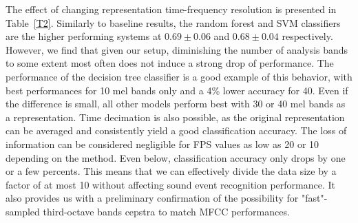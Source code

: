 \documentclass[final,3p,times,twocolumn]{elsarticle}
\begin{document}
The effect of changing representation time-frequency resolution is presented in Table~\ref{T2}. Similarly to baseline results, the random forest and SVM classifiers are the higher performing systems at $0.69\pm 0.06$ and $0.68\pm 0.04$ respectively. However, we find that given our setup, diminishing the number of analysis bands to some extent most often does not induce a strong drop of performance. The performance of the decision tree classifier is a good example of this behavior, with best performances for 10 mel bands only and a 4\% lower accuracy for 40. Even if the difference is small, all other models perform best with 30 or 40 mel bands as a representation. Time decimation is also possible, as the original representation can be averaged and consistently yield a good classification accuracy. The loss of information can be considered negligible for FPS values as low as 20 or 10 depending on the method. Even below, classification accuracy only drops by one or a few percents. This means that we can effectively divide the data size by a factor of at most 10 without affecting sound event recognition performance. It also provides us with a preliminary confirmation of the possibility for "fast"-sampled third-octave bands cepstra to match  MFCC performances.\\
\end{document}
